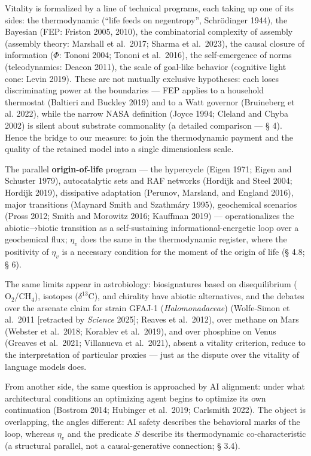 \documentclass[pdflatex,sn-mathphys-ay]{sn-jnl}
\begin{document}
Vitality is formalized by a line of technical programs, each taking up one of its sides: the thermodynamic (``life feeds on negentropy'', Schrödinger 1944), the Bayesian (FEP: Friston 2005, 2010), the combinatorial complexity of assembly (assembly theory: Marshall et al.~2017; Sharma et al.~2023), the causal closure of information (\(\Phi\): Tononi 2004; Tononi et al.~2016), the self-emergence of norms (teleodynamics: Deacon 2011), the scale of goal-like behavior (cognitive light cone: Levin 2019). These are not mutually exclusive hypotheses: each loses discriminating power at the boundaries --- FEP applies to a household thermostat (Baltieri and Buckley 2019) and to a Watt governor (Bruineberg et al. 2022), while the narrow NASA definition (Joyce 1994; Cleland and Chyba 2002) is silent about substrate commonality (a detailed comparison --- § 4). Hence the bridge to our measure: to join the thermodynamic payment and the quality of the retained model into a single dimensionless scale.

The parallel \textbf{origin-of-life} program --- the hypercycle (Eigen 1971; Eigen and Schuster 1979), autocatalytic sets and RAF networks (Hordijk and Steel 2004; Hordijk 2019), dissipative adaptation (Perunov, Marsland, and England 2016), major transitions (Maynard Smith and Szathmáry 1995), geochemical scenarios (Pross 2012; Smith and Morowitz 2016; Kauffman 2019) --- operationalizes the abiotic→biotic transition as a self-sustaining informational-energetic loop over a geochemical flux; \(\eta_v\) does the same in the thermodynamic register, where the positivity of \(\eta_v\) is a necessary condition for the moment of the origin of life (§ 4.8; § 6).

The same limits appear in astrobiology: biosignatures based on disequilibrium (\(\text{O}_2\)/\(\text{CH}_4\)), isotopes (\(\delta^{13}\text{C}\)), and chirality have abiotic alternatives, and the debates over the arsenate claim for strain GFAJ-1 (\emph{Halomonadaceae}) (Wolfe-Simon et al.~2011 {[}retracted by \emph{Science} 2025{]}; Reaves et al.~2012), over methane on Mars (Webster et al.~2018; Korablev et al.~2019), and over phosphine on Venus (Greaves et al.~2021; Villanueva et al.~2021), absent a vitality criterion, reduce to the interpretation of particular proxies --- just as the dispute over the vitality of language models does.

From another side, the same question is approached by AI alignment: under what architectural conditions an optimizing agent begins to optimize its own continuation (Bostrom 2014; Hubinger et al.~2019; Carlsmith 2022). The object is overlapping, the angles different: AI safety describes the behavioral marks of the loop, whereas \(\eta_v\) and the predicate \(S\) describe its thermodynamic co-characteristic (a structural parallel, not a causal-generative connection; § 3.4).
\end{document}
